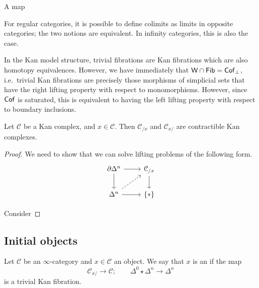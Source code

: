 \documentclass[main.tex]{subfiles}
\begin{document}
\begin{corollary}
  A map
\end{corollary}

For regular categories, it is possible to define colimits as limits in opposite categories; the two notions are equivalent. In infinity categories, this is also the case.

In the Kan model structure, trivial fibrations are Kan fibrations which are also homotopy equivalences. However, we have immediately that $\mathsf{W} \cap \mathsf{Fib} = \mathsf{Cof}_{\perp}$, i.e.\ trivial Kan fibrations are precisely those morphisms of simplicial sets that have the right lifting property with respect to monomorphisms. However, since $\mathsf{Cof}$ is saturated, this is equivalent to having the left lifting property with respect to boundary inclusions.

\begin{lemma}
  \label{lemma:under_over_categories_of_kan_complex_are_contractible}
  Let $\mathcal{C}$ be a Kan complex, and $x \in \mathcal{C}$. Then $\mathcal{C}_{/x}$ and $\mathcal{C}_{x/}$ are contractible Kan complexes.
\end{lemma}
\begin{proof}
  We need to show that we can solve lifting problems of the following form.
  \begin{equation*}
    \begin{tikzcd}
      \partial \Delta^{n}
      \arrow[r]
      \arrow[d]
      & \mathcal{C}_{/x}
      \arrow[d]
      \\
      \Delta^{n}
      \arrow[r]
      \arrow[ur, dashed]
      & \{*\}
    \end{tikzcd}
  \end{equation*}

  Consider
\end{proof}

\subsection{Initial objects}
\label{ssc:initial_objects}


\begin{definition}
  \label{def:initial_object}
  Let $\mathcal{C}$ be an $\infty$-category and $x \in \mathcal{C}$ an object. We say that $x$ is an  if the map
  \begin{equation*}
    \mathcal{C}_{x/} \to \mathcal{C};\qquad \Delta^{0} \star \Delta^{n} \to \Delta^{n}
  \end{equation*}
  is a trivial Kan fibration.
\end{definition}
\end{document}

